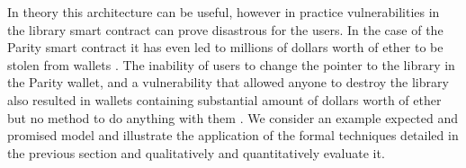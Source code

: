 

In theory this architecture can be useful, however in practice vulnerabilities in the library smart contract can prove disastrous for the users. In the case of the Parity smart contract it has even led to millions of dollars worth of ether to be stolen from wallets \cite{multisighack}. The inability of users to change the pointer to the library in the Parity wallet, and a vulnerability that allowed anyone to destroy the library also resulted in wallets containing substantial amount of dollars worth of ether but no method to do anything with them \cite{killhack}. We consider an example expected and promised model and illustrate the application of the formal techniques detailed in the previous section and qualitatively and quantitatively evaluate it.

\medskip

%   


